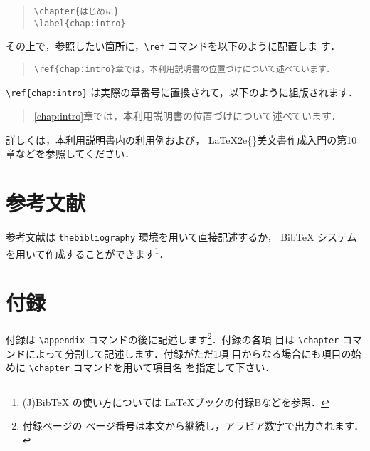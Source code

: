 \documentclass[
  sotsuron]{kuee}
\begin{document}
\begin{quote}
  \begin{verbatim}
\chapter{はじめに}
\label{chap:intro}
\end{verbatim}
\end{quote}

その上で，参照したい箇所に，\verb+\ref+ コマンドを以下のように配置しま
す．

\begin{quote}
  \begin{verbatim}
\ref{chap:intro}章では，本利用説明書の位置づけについて述べています．
\end{verbatim}
\end{quote}

\verb+\ref{chap:intro}+
は実際の章番号に置換されて，以下のように組版されます．

\begin{quote}
  \ref{chap:intro}章では，本利用説明書の位置づけについて述べています．
\end{quote}

詳しくは，本利用説明書内の利用例および，
\LaTeX2e\{\}美文書作成入門\cite{GuideBook}の第10章などを参照してください．

\hypertarget{ux53c2ux8003ux6587ux732e}{%
\section{参考文献}\label{ux53c2ux8003ux6587ux732e}}

参考文献は \verb+thebibliography+ 環境を用いて直接記述するか， BibTeX
システムを用いて作成することができます\footnote{(J)BibTeX
  の使い方については \LaTeX ブック\cite{LaTeX}の付録Bなどを参照．}．

\hypertarget{ux4ed8ux9332}{%
\section{付録}\label{ux4ed8ux9332}}

付録は \verb+\appendix+ コマンドの後に記述します\footnote{付録ページの
  ページ番号は本文から継続し，アラビア数字で出力されます．}．付録の各項
目は \verb+\chapter+ コマンドによって分割して記述します．付録がただ1項
目からなる場合にも項目の始めに \verb+\chapter+ コマンドを用いて項目名
を指定して下さい．
\end{document}
